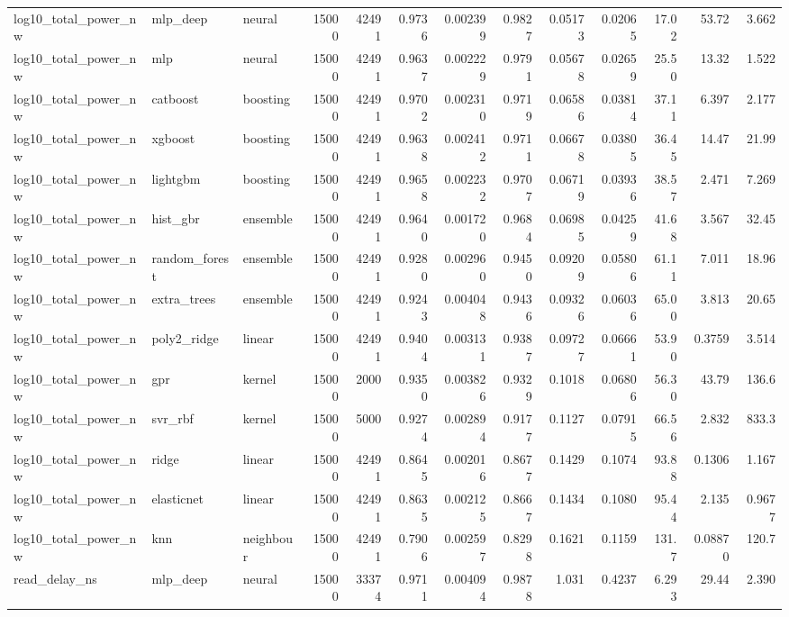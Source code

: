 \begin{table}[!t]
\begin{tabular}{lllrrrrrrrrrr}
log10\_total\_power\_nw & mlp\_deep & neural & 15000 & 42491 & 0.9736 & 0.002399 & 0.9827 & 0.05173 & 0.02065 & 17.02 & 53.72 & 3.662 \\
log10\_total\_power\_nw & mlp & neural & 15000 & 42491 & 0.9637 & 0.002229 & 0.9791 & 0.05678 & 0.02659 & 25.50 & 13.32 & 1.522 \\
log10\_total\_power\_nw & catboost & boosting & 15000 & 42491 & 0.9702 & 0.002310 & 0.9719 & 0.06586 & 0.03814 & 37.11 & 6.397 & 2.177 \\
log10\_total\_power\_nw & xgboost & boosting & 15000 & 42491 & 0.9638 & 0.002412 & 0.9711 & 0.06678 & 0.03805 & 36.45 & 14.47 & 21.99 \\
log10\_total\_power\_nw & lightgbm & boosting & 15000 & 42491 & 0.9658 & 0.002232 & 0.9707 & 0.06719 & 0.03936 & 38.57 & 2.471 & 7.269 \\
log10\_total\_power\_nw & hist\_gbr & ensemble & 15000 & 42491 & 0.9640 & 0.001720 & 0.9684 & 0.06985 & 0.04259 & 41.68 & 3.567 & 32.45 \\
log10\_total\_power\_nw & random\_forest & ensemble & 15000 & 42491 & 0.9280 & 0.002960 & 0.9450 & 0.09209 & 0.05806 & 61.11 & 7.011 & 18.96 \\
log10\_total\_power\_nw & extra\_trees & ensemble & 15000 & 42491 & 0.9243 & 0.004048 & 0.9436 & 0.09326 & 0.06036 & 65.00 & 3.813 & 20.65 \\
log10\_total\_power\_nw & poly2\_ridge & linear & 15000 & 42491 & 0.9404 & 0.003131 & 0.9387 & 0.09727 & 0.06661 & 53.90 & 0.3759 & 3.514 \\
log10\_total\_power\_nw & gpr & kernel & 15000 & 2000 & 0.9350 & 0.003826 & 0.9329 & 0.1018 & 0.06806 & 56.30 & 43.79 & 136.6 \\
log10\_total\_power\_nw & svr\_rbf & kernel & 15000 & 5000 & 0.9274 & 0.002894 & 0.9177 & 0.1127 & 0.07915 & 66.56 & 2.832 & 833.3 \\
log10\_total\_power\_nw & ridge & linear & 15000 & 42491 & 0.8645 & 0.002016 & 0.8677 & 0.1429 & 0.1074 & 93.88 & 0.1306 & 1.167 \\
log10\_total\_power\_nw & elasticnet & linear & 15000 & 42491 & 0.8635 & 0.002125 & 0.8667 & 0.1434 & 0.1080 & 95.44 & 2.135 & 0.9677 \\
log10\_total\_power\_nw & knn & neighbour & 15000 & 42491 & 0.7906 & 0.002597 & 0.8298 & 0.1621 & 0.1159 & 131.7 & 0.08870 & 120.7 \\
read\_delay\_ns & mlp\_deep & neural & 15000 & 33374 & 0.9711 & 0.004094 & 0.9878 & 1.031 & 0.4237 & 6.293 & 29.44 & 2.390 \\

\end{tabular}
\end{table}
